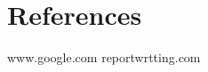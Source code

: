 \documentclass[options]{article}
\begin{document}
\section{\textbf{References}}
www.google.com
reportwrtting.com











                                                               
\end{document}
